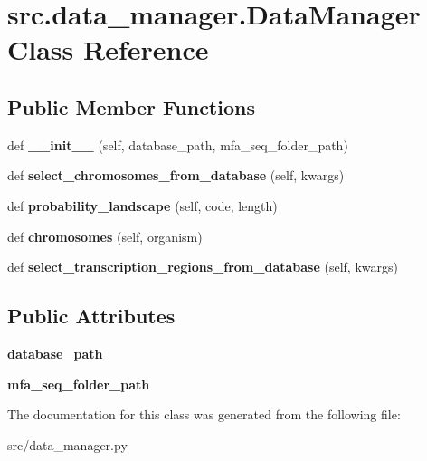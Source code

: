 \hypertarget{classsrc_1_1data__manager_1_1DataManager}{}\section{src.\+data\+\_\+manager.\+Data\+Manager Class Reference}
\label{classsrc_1_1data__manager_1_1DataManager}
\subsection*{Public Member Functions}
\begin{DoxyCompactItemize}
\item 
\mbox{\label{classsrc_1_1data__manager_1_1DataManager_a42184b2dcbbba2c4969101cdb53395c4}} 
def {\bfseries \+\_\+\+\_\+init\+\_\+\+\_\+} (self, database\+\_\+path, mfa\+\_\+seq\+\_\+folder\+\_\+path)
\item 
\mbox{\label{classsrc_1_1data__manager_1_1DataManager_aab4edc34427022cd4caa43b82fa2adc4}} 
def {\bfseries select\+\_\+chromosomes\+\_\+from\+\_\+database} (self, kwargs)
\item 
\mbox{\label{classsrc_1_1data__manager_1_1DataManager_a6b35cd60f52cc1abc9957aa363e59712}} 
def {\bfseries probability\+\_\+landscape} (self, code, length)
\item 
\mbox{\label{classsrc_1_1data__manager_1_1DataManager_ada373c89a7f1f82aac59542c3d6ea11b}} 
def {\bfseries chromosomes} (self, organism)
\item 
\mbox{\label{classsrc_1_1data__manager_1_1DataManager_ab5e222aad259b9b0e256667f1bec4a42}} 
def {\bfseries select\+\_\+transcription\+\_\+regions\+\_\+from\+\_\+database} (self, kwargs)
\end{DoxyCompactItemize}
\subsection*{Public Attributes}
\begin{DoxyCompactItemize}
\item 
\mbox{\label{classsrc_1_1data__manager_1_1DataManager_a5a9ed87f655ff2412875270abccd3384}} 
{\bfseries database\+\_\+path}
\item 
\mbox{\label{classsrc_1_1data__manager_1_1DataManager_aeef881e81651c00a48079f32e69da717}} 
{\bfseries mfa\+\_\+seq\+\_\+folder\+\_\+path}
\end{DoxyCompactItemize}


The documentation for this class was generated from the following file\+:\begin{DoxyCompactItemize}
\item 
src/data\+\_\+manager.\+py\end{DoxyCompactItemize}
